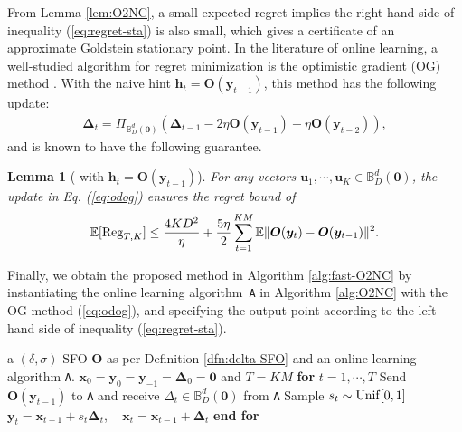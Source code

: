 \documentclass{article}
\def\vzero{{\bm{0}}}
\def\vh{{\bm{h}}}
\def\vu{{\bm{u}}}
\def\vx{{\bm{x}}}
\def\vy{{\bm{y}}}
\def\vz{{\bm{z}}}
\def\mO{{\bm{O}}}
\def\sB{{\mathbb{B}}}
\newcommand{\E}{\mathbb{E}}
\def\vDelta{{\bm{\Delta}}}
\newtheorem{lem}{Lemma}[section]
\theoremstyle{definition}
\theoremstyle{remark}
\begin{document}
	From Lemma \ref{lem:O2NC}, a small expected regret implies the right-hand side of inequality (\ref{eq:regret-sta}) is also small, which gives a certificate of an approximate Goldstein stationary point. In the literature of online learning, a well-studied algorithm for regret minimization is the optimistic gradient (OG) method \citep{hazan2007online,daskalakis2021near,cutkosky2023optimal,patitucci2025improving,jiang2025improved,rakhlin2013online}. With the naive hint $\vh_t = \mO(\vy_{t-1})$, this method has the following update:
	\begin{align} \label{eq:odog}
		\vDelta_{t} = \Pi_{\sB_D^d(\vzero)} (\vDelta_{t-1} - 2\eta\mO(\vy_{t-1}) + \eta \mO(\vy_{t-2})),
	\end{align}
	and is known to have the following guarantee.
	\begin{lem}[{\citet[Lemma 3.1]{patitucci2025improving}} with $\vh_t = \mO(\vy_{t-1})$] \label{lem:odog}
		For any vectors $\vu_1,\cdots,\vu_K \in \sB_D^d(\vzero)$,
		the update in Eq. (\ref{eq:odog}) ensures the regret bound of
		\begin{align*}
			\E[{\rm Reg}_{T,K}] \le \frac{4 K D^2}{\eta} + \frac{5 \eta}{2} \sum_{t=1}^{KM} \E \Vert \mO(\vy_t) - \mO(\vy_{t-1}) \Vert^2.
		\end{align*}
	\end{lem}
	Finally, we obtain the proposed method in Algorithm \ref{alg:fast-O2NC} by instantiating the online learning algorithm~\texttt{A} in Algorithm \ref{alg:O2NC} with the OG method (\ref{eq:odog}), and specifying the output point according to the left-hand side of inequality (\ref{eq:regret-sta}).
	
	\begin{algorithm}[htbp]  
		\caption{O2NC on $f_\delta$($ K,M, D$)}  \label{alg:O2NC}
		\renewcommand{\algorithmicrequire}{\textbf{Input:}}
		\begin{algorithmic}[1] 
			\Require a $(\delta,\sigma)$-SFO $\mO$ as per Definition \ref{dfn:delta-SFO} and an online learning algorithm \texttt{A}.
			\State  $\vx_0 = \vy_0 = \vy_{-1} =  \vDelta_0 =  \vzero $ and $T = KM$ 
			\State \textbf{for} $t=1,\cdots,T$
			\State \quad Send $\mO(\vy_{t-1})$ to \texttt{A} and receive $\Delta_{t} \in \sB_D^d(\vzero)$ from \texttt{A}  \label{line:online-alg}
			\State \quad Sample $s_t \sim {\rm Unif}[0,1]$
			\State \quad $ \vy_{t} = \vx_{t-1} +  s_t \vDelta_{t}$, ~ $\vx_{t} = \vx_{t-1} + \vDelta_{t}$   
			\State \textbf{end for}
		\end{algorithmic}
	\end{algorithm}
	
\end{document}
